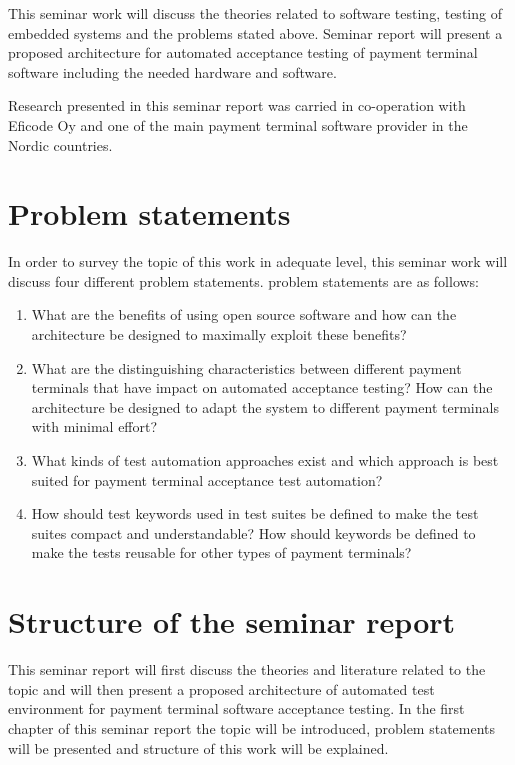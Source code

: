 This seminar work will discuss the theories related to software testing, testing of embedded systems and the problems stated above. Seminar report will present a proposed architecture for automated acceptance testing of payment terminal software including the needed hardware and software.

Research presented in this seminar report was carried in co-operation with Eficode Oy and one of the main payment terminal software provider in the Nordic countries.

\section{Problem statements}

In order to survey the topic of this work in adequate level, this seminar work will discuss four different problem statements. problem statements are as follows:
\begin{enumerate}
\item What are the benefits of using open source software and how can the architecture be designed to maximally exploit these benefits?
\item What are the distinguishing characteristics between different payment terminals that have impact on automated acceptance testing? How can the architecture be designed to adapt the system to different payment terminals with minimal effort?
\item What kinds of test automation approaches exist and which approach is best suited for payment terminal acceptance test automation?
\item How should test keywords used in test suites be defined to make
the test suites compact and understandable? How should keywords be defined to make the tests reusable for other types of payment terminals?
\end{enumerate}

\section{Structure of the seminar report}
\label{section:structure} 

This seminar report will first discuss the theories and literature related to the topic and will then present a proposed architecture of automated test environment for payment terminal software acceptance testing. In the first chapter of this seminar report the topic will be introduced, problem statements will be presented and structure of this work will be explained.

